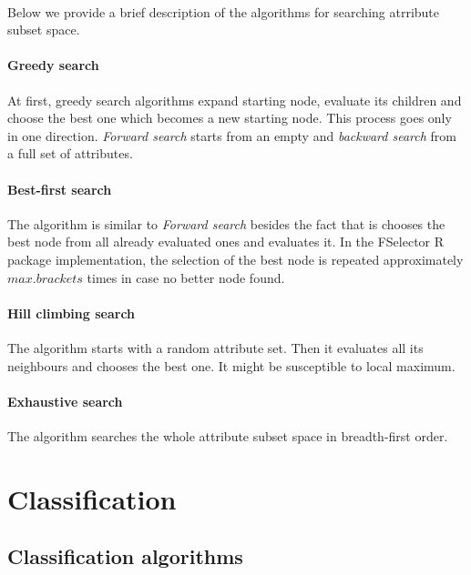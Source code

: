 \documentclass[10pt]{article}\usepackage[]{graphicx}\usepackage[]{color}
\begin{document}
\paragraph{}
Below we provide a brief description of the algorithms for searching atrribute subset space. 

\paragraph{Greedy search}
At first, greedy search algorithms expand starting node, evaluate its children and choose the best one which becomes a new starting node. This process goes only in one direction. \textit{Forward search} starts from an empty and \textit{backward search} from a full set of attributes.


\paragraph{Best-first search}
The algorithm is similar to \textit{Forward search} besides the fact that is chooses the best node from all already evaluated ones and evaluates it. In the FSelector R package implementation, the selection of the best node is repeated approximately $max.brackets$ times in case no better node found. 

\paragraph{Hill climbing search}
The algorithm starts with a random attribute set. Then it evaluates all its neighbours and chooses the best one. It might be susceptible to local maximum.

\paragraph{Exhaustive search}
The algorithm searches the whole attribute subset space in breadth-first order. 







\clearpage
\section{Classification}

\subsection{Classification algorithms}
\end{document}
